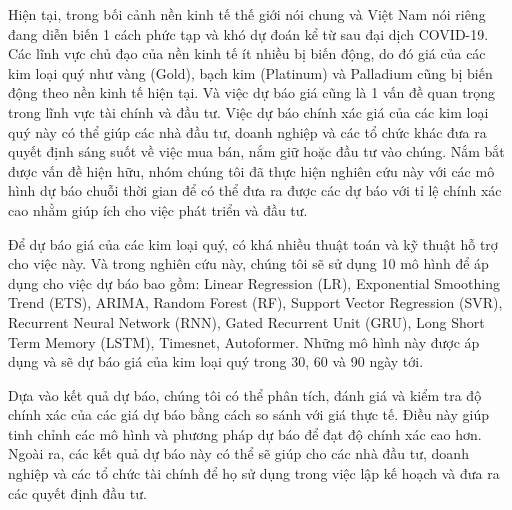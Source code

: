 Hiện tại, trong bối cảnh nền kinh tế thế giới nói chung và Việt Nam nói riêng đang diễn biến 1 cách phức tạp và khó dự đoán kể từ sau đại dịch COVID-19. Các lĩnh vực chủ đạo của nền kinh tế ít nhiều bị biến động, do đó giá của các kim loại quý như vàng (Gold), bạch kim (Platinum) và Palladium cũng bị biến động theo nền kinh tế hiện tại. Và việc dự báo giá cũng là 1 vấn đề quan trọng trong lĩnh vực tài chính và đầu tư. Việc dự báo chính xác giá của các kim loại quý này có thể giúp các nhà đầu tư, doanh nghiệp và các tổ chức khác đưa ra quyết định sáng suốt về việc mua bán, nắm giữ hoặc đầu tư vào chúng. Nắm bắt được vấn đề hiện hữu, nhóm chúng tôi đã thực hiện nghiên cứu này với các mô hình dự báo chuỗi thời gian để có thể đưa ra được các dự báo với tỉ lệ chính xác cao nhằm giúp ích cho việc phát triển và đầu tư.

Để dự báo giá của các kim loại quý, có khá nhiều thuật toán và kỹ thuật hỗ trợ cho việc này. Và trong nghiên cứu này, chúng tôi sẽ sử dụng 10 mô hình để áp dụng cho việc dự báo bao gồm: Linear Regression (LR), Exponential Smoothing Trend (ETS), ARIMA, Random Forest (RF), Support Vector Regression (SVR), Recurrent Neural Network (RNN), Gated Recurrent Unit  (GRU), Long Short Term Memory (LSTM), Timesnet, Autoformer. Những mô hình này được áp dụng và sẽ dự báo giá của kim loại quý trong 30, 60 và 90 ngày tới.

Dựa vào kết quả dự báo, chúng tôi có thể phân tích, đánh giá và kiểm tra độ chính xác của các giá dự báo bằng cách so sánh với giá thực tế. Điều này giúp tinh chỉnh các mô hình và phương pháp dự báo để đạt độ chính xác cao hơn. Ngoài ra, các kết quả dự báo này có thể sẽ giúp cho các nhà đầu tư, doanh nghiệp và các tổ chức tài chính để họ sử dụng trong việc lập kế hoạch và đưa ra các quyết định đầu tư.